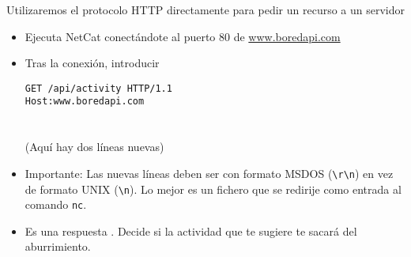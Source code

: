 \begin{homeworkProblem}
  Utilizaremos el protocolo HTTP directamente para pedir un recurso a un servidor
\begin{comment}
  \begin{itemize}
  \item Ejecuta NetCat conectándote al puerto 80 de \url{quotes.rest}
  \item Tras la conexión, introducir
    \begin{cuadrito}
      \texttt{GET /qod HTTP/1.1} \\
      \texttt{Host:quotes.rest} \\
      \\
      \\
      (Aquí hay que darle al Enter dos veces)
    \end{cuadrito}
  \item Es una respuesta \enlace{https://es.wikipedia.org/wiki/JSON}{JSON}. Decide si la respuesta te resulta inspiradora. Si no, puedes volver a intentarlo mañana.
  \end{itemize}


  https://apipheny.io/free-api/


  
\end{comment}

  \begin{itemize}
\item Ejecuta NetCat conectándote al puerto 80 de \url{www.boredapi.com}
\item Tras la conexión, introducir
  \begin{cuadrito}
    \texttt{GET /api/activity HTTP/1.1} \\
    \texttt{Host:www.boredapi.com} \\
    \\
    \\
    (Aquí hay dos líneas nuevas)
  \end{cuadrito}
\item Importante: Las nuevas líneas deben ser con formato MSDOS (\texttt{\textbackslash r\textbackslash n}) en vez de formato UNIX (\texttt{\textbackslash n}). Lo mejor es un fichero que se redirije como entrada al comando \texttt{nc}.  
\item Es una respuesta . Decide si la actividad que te sugiere te sacará del aburrimiento.
\end{itemize}


\end{homeworkProblem}


